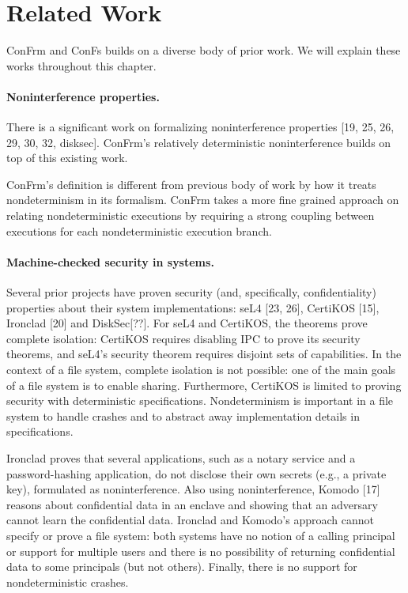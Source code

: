 \section{Related Work}

ConFrm and ConFs builds on a diverse body of prior work. We will explain these works throughout this chapter. 

\paragraph{Noninterference properties.} There is a significant work on formalizing noninterference properties [19, 25, 26, 29, 30, 32, disksec]. ConFrm's relatively deterministic noninterference builds on top of this existing work. 

ConFrm's definition is different from previous body of work by how it treats nondeterminism in its formalism. ConFrm takes a more fine grained approach on relating nondeterministic executions by requiring a strong coupling between executions for each nondeterministic execution branch.

\paragraph{Machine-checked security in systems.} 
Several prior
projects have proven security (and, specifically, confidentiality) properties about their system implementations:
seL4 [23, 26], CertiKOS [15], Ironclad [20] and DiskSec[??]. For
seL4 and CertiKOS, the theorems prove complete isolation: CertiKOS requires disabling IPC to prove its security
theorems, and seL4’s security theorem requires disjoint
sets of capabilities. In the context of a file system, complete isolation is not possible: one of the main goals of a
file system is to enable sharing. Furthermore, CertiKOS
is limited to proving security with deterministic specifications. Nondeterminism is important in a file system
to handle crashes and to abstract away implementation
details in specifications.

Ironclad proves that several applications, such as a notary service and a password-hashing application, do not
disclose their own secrets (e.g., a private key), formulated as noninterference. Also using noninterference, Komodo [17] reasons about confidential data in an enclave
and showing that an adversary cannot learn the confidential data. Ironclad and Komodo’s approach cannot specify
or prove a file system: both systems have no notion of a
calling principal or support for multiple users and there
is no possibility of returning confidential data to some
principals (but not others). Finally, there is no support for
nondeterministic crashes.

